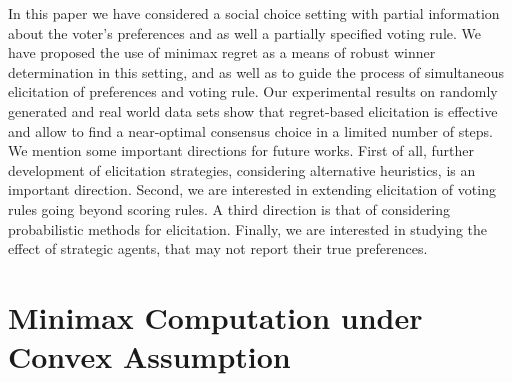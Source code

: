 In this paper we have considered a  social choice setting with partial  information about the voter's  
preferences and as well a partially specified voting rule.
We have proposed the use of minimax regret as a means of robust winner determination in this setting, and as well as to guide the process of simultaneous elicitation of preferences and voting rule.
Our experimental results on randomly generated and real world data sets show that regret-based elicitation is effective and allow to find a near-optimal consensus choice in a limited number of steps.
We mention some  important directions for future works.
First of all, further development of elicitation strategies, considering alternative heuristics, is an important direction. 
Second, we are interested in extending elicitation of voting rules going beyond scoring rules.
A third direction is that of considering probabilistic methods for elicitation.
Finally, we are interested in studying the effect of strategic agents, that may not report their true preferences.



% 

\pagebreak
\ifappendix
\appendix
\section{Minimax Computation under Convex Assumption} 

